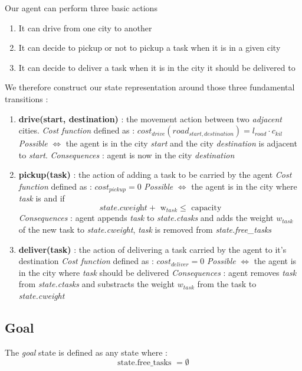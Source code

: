 \documentclass[11pt]{article}
\begin{document}
Our agent can perform three basic actions 
\begin{enumerate}
    \item It can drive from one city to another
    \item It can decide to pickup or not to pickup a task when it is in a given city
    \item It can decide to deliver a task when it is in the city it should be delivered to 
\end{enumerate}
We therefore construct our state representation around those three fundamental transitions :
\begin{enumerate}
    \item \textbf{drive(start, destination)} : the movement action between two \emph{adjacent} cities.
    \subitem \emph{Cost function} defined as : $cost_{drive}(road_{start,destination}) = l_{road} \cdot c_{kil} $
    \subitem \emph{Possible} $\iff$ the agent is in the city \emph{start} and the city \emph{destination} is adjacent to \emph{start}.
    \subitem \emph{Consequences} : agent is now in the city \emph{destination}
    \item \textbf{pickup(task)} : the action of adding a task to be carried by the agent
    \subitem \emph{Cost function} defined as : $cost_{pickup}=0$
    \subitem \emph{Possible} $\iff$ the agent is in the city where \emph{task} is and if \[\textit{state.cweight}+\text{ w$_{task}$} \leq \text{ capacity}\]
    \subitem \emph{Consequences} : agent appends \emph{task} to \emph{state.ctasks} and adds the weight $w_{task}$ of the new task to \emph{state.cweight}, \emph{task} is removed from \emph{state.free\_tasks}
    \item \textbf{deliver(task)} : the action of delivering a task carried by the agent to it's destination
    \subitem \emph{Cost function} defined as : $cost_{deliver}=0$
    \subitem \emph{Possible} $\iff$ the agent is in the city where \emph{task} should be delivered
    \subitem \emph{Consequences} : agent removes \emph{task} from \emph{state.ctasks} and substracts the weight $w_{task}$ from the task to \emph{state.cweight}
\end{enumerate}

\subsection{Goal}

The \emph{goal} state is defined as any state where :
\[\text{state.free\_tasks } = \emptyset\]
\end{document}
